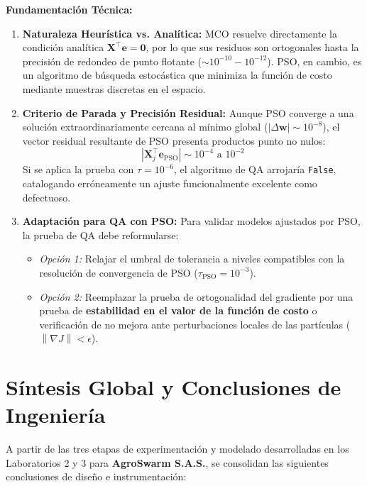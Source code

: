 \documentclass[12pt,a4paper]{article}
\newcommand{\norm}[1]{\left\lVert #1\right\rVert}
\begin{document}
\textbf{Fundamentación Técnica:}
\begin{enumerate}
  \item \textbf{Naturaleza Heurística vs. Analítica:} MCO resuelve directamente la condición analítica $\mathbf{X}^\top \mathbf{e} = \mathbf{0}$, por lo que sus residuos son ortogonales hasta la precisión de redondeo de punto flotante ($\sim 10^{-10} - 10^{-12}$). PSO, en cambio, es un algoritmo de búsqueda estocástica que minimiza la función de costo mediante muestras discretas en el espacio.
  \item \textbf{Criterio de Parada y Precisión Residual:} Aunque PSO converge a una solución extraordinariamente cercana al mínimo global ($|\Delta \mathbf{w}| \sim 10^{-8}$), el vector residual resultante de PSO presenta productos punto no nulos:
  \begin{equation}
    |\mathbf{X}_j^\top \mathbf{e}_{\text{PSO}}| \sim 10^{-4} \text{ a } 10^{-2}
  \end{equation}
  Si se aplica la prueba con $\tau = 10^{-6}$, el algoritmo de QA arrojaría \texttt{False}, catalogando erróneamente un ajuste funcionalmente excelente como defectuoso.
  \item \textbf{Adaptación para QA con PSO:} Para validar modelos ajustados por PSO, la prueba de QA debe reformularse:
  \begin{itemize}[label={\color{p3blue}$\blacktriangleright$}]
    \item \textit{Opción 1:} Relajar el umbral de tolerancia a niveles compatibles con la resolución de convergencia de PSO ($\tau_{\text{PSO}} = 10^{-3}$).
    \item \textit{Opción 2:} Reemplazar la prueba de ortogonalidad del gradiente por una prueba de \textbf{estabilidad en el valor de la función de costo} o verificación de no mejora ante perturbaciones locales de las partículas ($\norm{\nabla J} < \epsilon$).
  \end{itemize}
\end{enumerate}

\newpage
\section{Síntesis Global y Conclusiones de Ingeniería}

A partir de las tres etapas de experimentación y modelado desarrolladas en los Laboratorios 2 y 3 para \textbf{AgroSwarm S.A.S.}, se consolidan las siguientes conclusiones de diseño e instrumentación:
\end{document}
